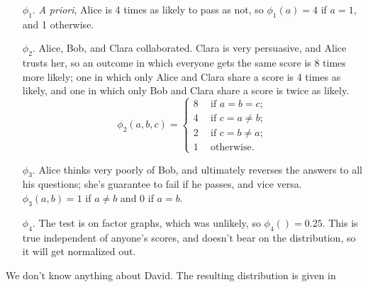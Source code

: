 \documentclass{article}
\numberwithin{equation}{section}
\begin{document}
\begin{example}
		
		\begin{enumerate}[nosep]
		\item[$\phi_1$.] \emph{A priori}, Alice is 4 times
                  as likely to pass as not, so $\phi_1(a)
                          = 4$ if $a = 1$, and 1 otherwise. 
\item[$\phi_2$.] Alice, Bob, and Clara
                          collaborated. Clara is very persuasive, and
                          Alice trusts her, so an outcome in which
                          everyone gets the same score is 8 times more
                          likely; one in which only Alice and Clara
                          share a score is 4 times as likely, and one
                          in which only Bob and Clara share a score is
                          twice as likely. 
			\[ \phi_2(a,b,c) = \left\{\begin{aligned}
                  			8 &~~ \text{if~} a = b = c;\\
                                        4 &~~ \text{if~}c = a \neq b; \\
  				2 &~~ \text{if~}c = b \neq a;\\
				1 &~~ \text{otherwise.}
			\end{aligned}\right. \]
			\item[$\phi_3$.] Alice thinks very poorly of
                          Bob, and ultimately reverses the answers to
                          all his questions; she's guarantee to fail
                          if he passes, and vice versa. $\phi_3(a,b) =
                          1$ if $a \neq b$ and 0 if $a=b$. 
\item[$\phi_4$.] The test is on factor graphs, which was unlikely, so $\phi_4() = 0.25$. This is true independent of anyone's scores, and doesn't bear on the distribution, so it will get normalized out.
		\end{enumerate}
		We don't know anything about David. The resulting distribution is given in 
		

\end{example}
\end{document}
